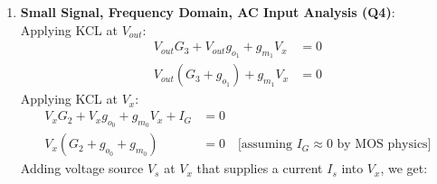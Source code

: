 \begin{enumerate}
    The input current is the current through \(G_2\) and the output
    current is the drain current of \(M_1\):
    \begin{align*}
      I_{IN} &= (V_{cc} - V_{X})G_2 = I_{M_0} + I_{G} \approx I_{M_0} \quad \text{[from (2), } I_G \approx 0 \text{ by MOS physics]} \\
      I_{OUT} &= (V_{cc} - V_{OUT})G_3 = I_{M_1} \quad \text{[from (1)]}
    \end{align*}
    Both transistors share \(V_{GS} = V_X - V_{ee}\), so dividing the
    second line of (4) by the second line of (3) cancels the square term:
    \begin{align*}
      \frac{I_{M_1}}{I_{M_0}} &= \frac{k_{n_1}(V_{X} - V_{ee} - V_{th})^2 (1 + K_{CLM} (V_{OUT} - V_{ee}))}{k_{n_0}(V_{X} - V_{ee} - V_{th})^2 (1 + K_{CLM} (V_{X} - V_{ee}))} \\
                              &= \frac{k_{n_1}}{k_{n_0}} \cdot \frac{1 + K_{CLM} (V_{OUT} - V_{ee})}{1 + K_{CLM} (V_{X} - V_{ee})} \\
                              &= \frac{k_{n_1}}{k_{n_0}} \quad \text{[assuming } K_{CLM} = 0 \text{, or } V_{OUT} = V_X \text{]}
    \end{align*}
    Thus, with \(k_n = \frac{K_P}{2}\frac{W}{L}\),
    \begin{align*}
      \frac{I_{OUT}}{I_{IN}} \approx \frac{I_{M_1}}{I_{M_0}} \approx \frac{k_{n_1}}{k_{n_0}} = \frac{\frac{K_P}{2} \frac{W_1}{L_1}}{\frac{K_P}{2} \frac{W_0}{L_0}} = \frac{\frac{W_1}{L_1}}{\frac{W_0}{L_0}} = \frac{W_1 L_0}{L_1 W_0}
    \end{align*}
  \item \textbf{Small Signal, Frequency Domain, AC Input Analysis (Q4)}:\\
    Applying KCL at $V_{out}$:
    \begin{align*}
      V_{out}G_3 + V_{out}g_{o_1} + g_{m_1}V_{x} &= 0 \\
      V_{out}(G_3 + g_{o_1}) + g_{m_1}V_{x} &= 0 \tag{5}
    \end{align*}
    Applying KCL at $V_{x}$:
    \begin{align*}
      V_{x}G_2 + V_{x}g_{o_0} + g_{m_0}V_{x} + I_{G} &= 0 \\
      V_{x}(G_2 + g_{o_0} + g_{m_0}) &= 0 \quad \text{[assuming } I_G \approx 0 \text{ by MOS physics]} \tag{6}
    \end{align*}
    Adding voltage source $V_s$ at $V_x$ that supplies
    a current $I_s$ into $V_{x}$, we get:
    \begin{align*}

\end{align*}
\end{enumerate}
